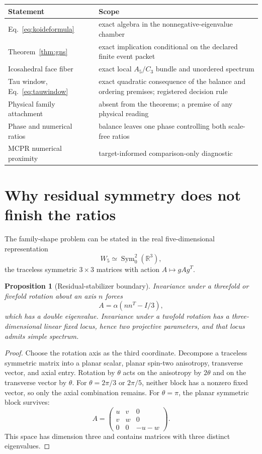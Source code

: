 \documentclass[11pt]{article}
\newtheorem{proposition}[theorem]{Proposition}
\theoremstyle{remark}
\newcommand{\R}{\mathbb R}
\begin{document}
\begin{center}
\begin{tabular}{@{}p{}p{}@{}}
\toprule
Statement & Scope \\
\midrule
Eq.~\eqref{eq:koideformula} & exact algebra in the nonnegative-eigenvalue chamber \\
Theorem~\ref{thm:gns} & exact implication conditional on the declared finite event packet \\
Icosahedral face fiber & exact local \(A_5/C_3\) bundle and unordered spectrum \\
Tau window, Eq.~\eqref{eq:tauwindow} & exact quadratic consequence of the balance and ordering premises; registered decision rule \\
Physical family attachment & absent from the theorems; a premise of any physical reading \\
Phase and numerical ratios & balance leaves one phase controlling both scale-free ratios \\
MCPR numerical proximity & target-informed comparison-only diagnostic \\
\bottomrule
\end{tabular}
\end{center}

\section{Why residual symmetry does not finish the ratios}

The family-shape problem can be stated in the real
five-dimensional representation
\[
W_5\simeq\operatorname{Sym}^2_0(\R^3),
\]
the traceless symmetric \(3\times3\) matrices with action
\(A\mapsto gAg^T\).

\begin{proposition}[Residual-stabilizer boundary]
Invariance under a threefold or fivefold rotation about an axis \(n\) forces
\[
A=\alpha(nn^T-I/3),
\]
which has a double eigenvalue. Invariance under a twofold rotation has a
three-dimensional linear fixed locus, hence two projective parameters, and
that locus admits simple spectrum.
\end{proposition}

\begin{proof}
Choose the rotation axis as the third coordinate. Decompose a traceless
symmetric matrix into a planar scalar, planar spin-two anisotropy, transverse
vector, and axial entry. Rotation by \(\theta\) acts on the anisotropy by
\(2\theta\) and on the transverse vector by \(\theta\). For
\(\theta=2\pi/3\) or \(2\pi/5\), neither block has a nonzero fixed vector, so
only the axial combination remains. For \(\theta=\pi\), the planar symmetric
block survives:
\[
A=\begin{pmatrix}
u&v&0\\
v&w&0\\
0&0&-u-w
\end{pmatrix}.
\]
This space has dimension three and contains matrices with three distinct
eigenvalues.
\end{proof}
\end{document}
